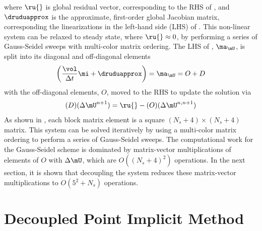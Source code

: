 where $\ru{}$ is global residual vector, corresponding to the RHS of
, and $\druduapprox$ is the approximate, first-order global
Jacobian matrix, corresponding the linearizations in the left-hand side (LHS) of
. This non-linear system can be relaxed to steady state, where
$\ru{} \approx 0$, by performing a series of Gauss-Seidel sweeps with
multi-color matrix ordering.  The LHS of , $\ma_{\mU}$, is split
into its diagonal and off-diagonal elements
\begin{equation}
  \left( \frac{\vol}{\Delta t} \mi + \druduapprox \right) = 
  \ma_{\mU} = O+D
  \label{decomp-jac}
\end{equation}
with the off-diagonal elements, $O$, moved to the RHS to update the solution via
\begin{equation}
  (D) (\Delta\mU^{n+1}) = \ru{} - (O) (\Delta \mU^{n,n+1})
  \label{delta}
\end{equation}
As shown in , each block matrix element is a square
$(N_s+4)\times(N_s+4)$ matrix.  This system can be solved iteratively by using a
multi-color matrix ordering to perform a series of Gauss-Seidel sweeps. The
computational work for the Gauss-Seidel scheme is dominated by matrix-vector
multiplications of elements of $O$ with $\Delta \mU$, which are $O((N_s + 4)^2)$
operations.  In the next section, it is shown that decoupling the system reduces
these matrix-vector multiplications to $O(5^2 + N_s)$ operations.

\section{Decoupled Point Implicit Method}

